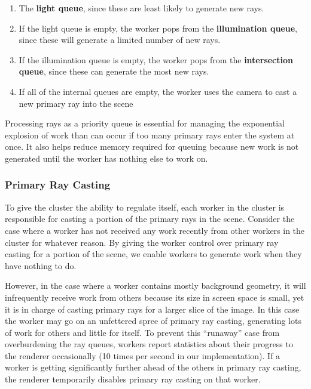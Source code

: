 \documentclass[a4paper,twoside]{article}
\begin{document}
\begin{enumerate}
   \item The \textbf{light queue}, since these are least likely to generate
      new rays.
   \item If the light queue is empty, the worker pops from the \textbf{illumination queue},
      since these will generate a limited number of new rays.
   \item If the illumination queue is empty, the worker pops from the
      \textbf{intersection queue}, since these can generate the most new rays.
   \item If all of the internal queues are empty, the worker uses the camera to cast a
      new primary ray into the scene %
\end{enumerate}

Processing rays as a priority queue is essential for managing the exponential
explosion of work than can occur if too many primary rays enter the system at
once. It also helps reduce memory required for queuing because new work is not
generated until the worker has nothing else to work on.

\subsubsection{Primary Ray Casting}
\label{primaryrays}

To give the cluster the ability to regulate itself, each worker in the cluster
is responsible for casting a portion of the primary rays in the scene. Consider
the case where a worker has not received any work recently from other workers
in the cluster for whatever reason. By giving the worker control over primary
ray casting for a portion of the scene, we enable workers to generate work when
they have nothing to do.

However, in the case where a worker contains mostly background geometry, it
will infrequently receive work from others because its size in screen space
is small, yet it is in charge of casting primary rays for a larger slice of
the image. In this case the worker may go on an unfettered spree of primary
ray casting, generating lots of work for others and little for itself. To
prevent this ``runaway'' case from overburdening the ray queues, workers
report statistics about their progress to the renderer occasionally (10 times
per second in our implementation). If a worker is getting significantly further 
ahead of the others in primary ray casting, the renderer temporarily disables 
primary ray casting on that worker.
\end{document}
